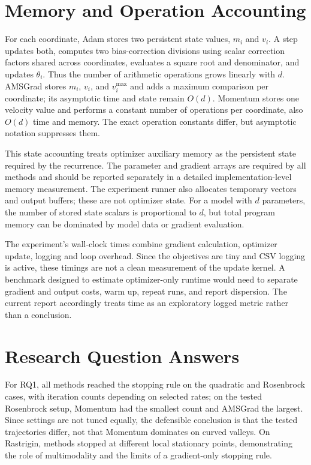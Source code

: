 \documentclass[conference]{IEEEtran}
\begin{document}
\section{Memory and Operation Accounting}
For each coordinate, Adam stores two persistent state values, $m_i$ and $v_i$. A step updates both, computes two bias-correction divisions using scalar correction factors shared across coordinates, evaluates a square root and denominator, and updates $\theta_i$. Thus the number of arithmetic operations grows linearly with $d$. AMSGrad stores $m_i$, $v_i$, and $v_i^{\max}$ and adds a maximum comparison per coordinate; its asymptotic time and state remain $O(d)$. Momentum stores one velocity value and performs a constant number of operations per coordinate, also $O(d)$ time and memory. The exact operation constants differ, but asymptotic notation suppresses them.

This state accounting treats optimizer auxiliary memory as the persistent state required by the recurrence. The parameter and gradient arrays are required by all methods and should be reported separately in a detailed implementation-level memory measurement. The experiment runner also allocates temporary vectors and output buffers; these are not optimizer state. For a model with $d$ parameters, the number of stored state scalars is proportional to $d$, but total program memory can be dominated by model data or gradient evaluation.

The experiment's wall-clock times combine gradient calculation, optimizer update, logging and loop overhead. Since the objectives are tiny and CSV logging is active, these timings are not a clean measurement of the update kernel. A benchmark designed to estimate optimizer-only runtime would need to separate gradient and output costs, warm up, repeat runs, and report dispersion. The current report accordingly treats time as an exploratory logged metric rather than a conclusion.
\section{Research Question Answers}
For RQ1, all methods reached the stopping rule on the quadratic and Rosenbrock cases, with iteration counts depending on selected rates; on the tested Rosenbrock setup, Momentum had the smallest count and AMSGrad the largest. Since settings are not tuned equally, the defensible conclusion is that the tested trajectories differ, not that Momentum dominates on curved valleys. On Rastrigin, methods stopped at different local stationary points, demonstrating the role of multimodality and the limits of a gradient-only stopping rule.
\end{document}
